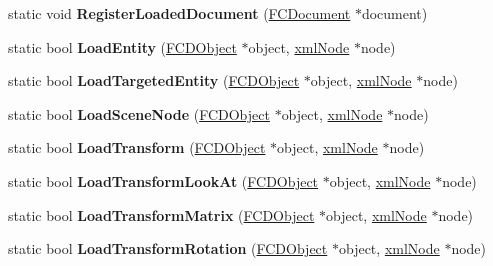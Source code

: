 \begin{DoxyCompactItemize}
\item 
\hypertarget{classFArchiveXML_a114e99422f7d398d7f59b21439cebe9e}{
static void {\bfseries RegisterLoadedDocument} (\hyperlink{classFCDocument}{FCDocument} $\ast$document)}
\label{classFArchiveXML_a114e99422f7d398d7f59b21439cebe9e}

\item 
\hypertarget{classFArchiveXML_a44ed8a9ade24b76a36fa20f875d31afc}{
static bool {\bfseries LoadEntity} (\hyperlink{classFCDObject}{FCDObject} $\ast$object, \hyperlink{struct__xmlNode}{xmlNode} $\ast$node)}
\label{classFArchiveXML_a44ed8a9ade24b76a36fa20f875d31afc}

\item 
\hypertarget{classFArchiveXML_ada4170520a4eb94ea5259c952c48c69b}{
static bool {\bfseries LoadTargetedEntity} (\hyperlink{classFCDObject}{FCDObject} $\ast$object, \hyperlink{struct__xmlNode}{xmlNode} $\ast$node)}
\label{classFArchiveXML_ada4170520a4eb94ea5259c952c48c69b}

\item 
\hypertarget{classFArchiveXML_a487520c0383bf2beccbe4ed9b47ea358}{
static bool {\bfseries LoadSceneNode} (\hyperlink{classFCDObject}{FCDObject} $\ast$object, \hyperlink{struct__xmlNode}{xmlNode} $\ast$node)}
\label{classFArchiveXML_a487520c0383bf2beccbe4ed9b47ea358}

\item 
\hypertarget{classFArchiveXML_aca9add5b61e4ccc0e22be9a2038b4352}{
static bool {\bfseries LoadTransform} (\hyperlink{classFCDObject}{FCDObject} $\ast$object, \hyperlink{struct__xmlNode}{xmlNode} $\ast$node)}
\label{classFArchiveXML_aca9add5b61e4ccc0e22be9a2038b4352}

\item 
\hypertarget{classFArchiveXML_a1169d63ba7a5e2afec67d3582f3093e1}{
static bool {\bfseries LoadTransformLookAt} (\hyperlink{classFCDObject}{FCDObject} $\ast$object, \hyperlink{struct__xmlNode}{xmlNode} $\ast$node)}
\label{classFArchiveXML_a1169d63ba7a5e2afec67d3582f3093e1}

\item 
\hypertarget{classFArchiveXML_a11bf1d14aa206adfd006733ad7e5015a}{
static bool {\bfseries LoadTransformMatrix} (\hyperlink{classFCDObject}{FCDObject} $\ast$object, \hyperlink{struct__xmlNode}{xmlNode} $\ast$node)}
\label{classFArchiveXML_a11bf1d14aa206adfd006733ad7e5015a}

\item 
\hypertarget{classFArchiveXML_a446646e0da33d48808c83018dfc9efdf}{
static bool {\bfseries LoadTransformRotation} (\hyperlink{classFCDObject}{FCDObject} $\ast$object, \hyperlink{struct__xmlNode}{xmlNode} $\ast$node)}
\label{classFArchiveXML_a446646e0da33d48808c83018dfc9efdf}


\end{DoxyCompactItemize}
